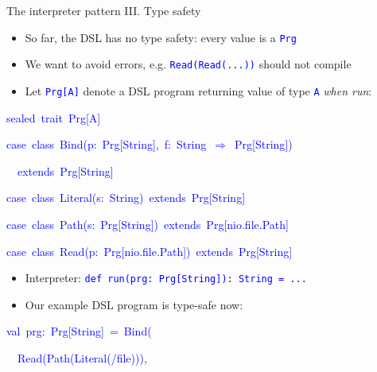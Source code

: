 \documentclass[english,,russian]{beamer}
\newenvironment{lyxcode}
  {\par\begin{list}{}{
    \setlength{\rightmargin}{\leftmargin}
    \setlength{\listparindent}{0pt}%
    \raggedright
    \setlength{\itemsep}{0pt}
    \setlength{\parsep}{0pt}
    \normalfont\ttfamily}%
   \def\{{\char`\{}
   \def\}{\char`\}}
   \def\textasciitilde{\char`\~}
   \item[]}
  {\end{list}}
\begin{document}
\begin{frame}{The interpreter pattern III. Type safety}
\begin{itemize}
\item So far, the DSL has no type safety: every value is a \texttt{\textcolor{blue}{\footnotesize{}Prg}} 
\item We want to avoid errors, e.g. \texttt{\textcolor{blue}{\footnotesize{}Read(Read(...))}}
should not compile
\item Let \texttt{\textcolor{blue}{\footnotesize{}Prg{[}A{]}}} denote a
DSL program returning value of type \texttt{\textcolor{blue}{\footnotesize{}A}}
\emph{when run}:
\end{itemize}
\begin{lyxcode}
\textcolor{blue}{\footnotesize{}sealed~trait~Prg{[}A{]}}{\footnotesize\par}

\textcolor{blue}{\footnotesize{}case~class~Bind(p:~Prg{[}String{]},~f:~String~$\Rightarrow$~Prg{[}String{]})}{\footnotesize\par}

\textcolor{blue}{\footnotesize{}~~extends~Prg{[}String{]}}{\footnotesize\par}

\textcolor{blue}{\footnotesize{}case~class~Literal(s:~String)~extends~Prg{[}String{]}~}{\footnotesize\par}

\textcolor{blue}{\footnotesize{}case~class~Path(s:~Prg{[}String{]})~extends~Prg{[}nio.file.Path{]}}{\footnotesize\par}

\textcolor{blue}{\footnotesize{}case~class~Read(p:~Prg{[}nio.file.Path{]})~extends~Prg{[}String{]}}{\footnotesize\par}
\end{lyxcode}
\begin{itemize}
\item Interpreter: \texttt{\textcolor{blue}{\footnotesize{}def run(prg: Prg{[}String{]}): String
= ...}}{\footnotesize\par}
\item Our example DSL program is type-safe now:
\end{itemize}
\begin{lyxcode}
\textcolor{blue}{\footnotesize{}val~prg:~Prg{[}String{]}~=~Bind(}{\footnotesize\par}

\textcolor{blue}{\footnotesize{}~~Read(Path(Literal(\textquotedbl /file\textquotedbl ))),}{\footnotesize\par}


\end{lyxcode}
\end{frame}
\end{document}
